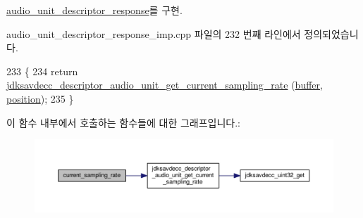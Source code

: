 \hyperlink{classavdecc__lib_1_1audio__unit__descriptor__response_a115c8f2c1f0bd18abff75088d1932b02}{audio\+\_\+unit\+\_\+descriptor\+\_\+response}를 구현.



audio\+\_\+unit\+\_\+descriptor\+\_\+response\+\_\+imp.\+cpp 파일의 232 번째 라인에서 정의되었습니다.


\begin{DoxyCode}
233 \{
234     \textcolor{keywordflow}{return} \hyperlink{group__descriptor__audio_gaf64e490813c4a70bd63a6f00374cb639}{jdksavdecc\_descriptor\_audio\_unit\_get\_current\_sampling\_rate}
      (\hyperlink{classavdecc__lib_1_1descriptor__response__base__imp_a56ed84df35de10bdb65e72b184309497}{buffer}, \hyperlink{classavdecc__lib_1_1descriptor__response__base__imp_a7a04afe5347934be732ec70a70bd0a28}{position});
235 \}
\end{DoxyCode}


이 함수 내부에서 호출하는 함수들에 대한 그래프입니다.\+:
\nopagebreak
\begin{figure}[H]
\begin{center}
\leavevmode
\includegraphics[width=350pt]{classavdecc__lib_1_1audio__unit__descriptor__response__imp_a8b01de9e6fc7f170f68e56d8ede21e54_cgraph}
\end{center}
\end{figure}


